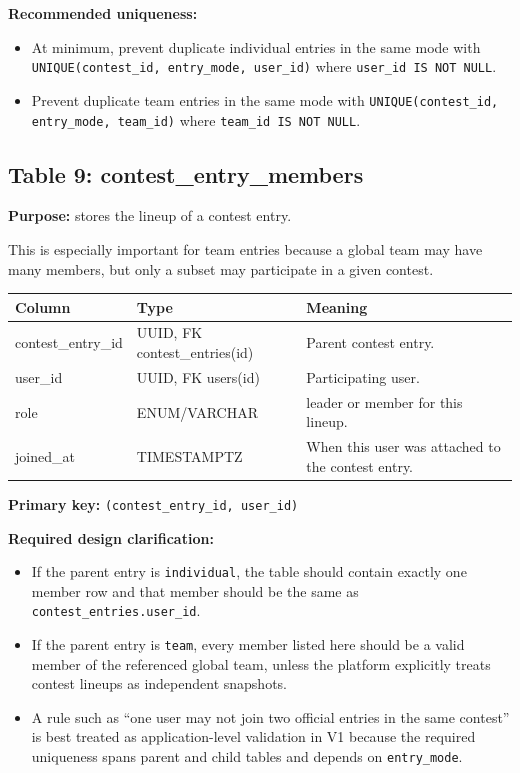 \documentclass[11pt,a4paper]{article}
\begin{document}
\textbf{Recommended uniqueness:}
\begin{itemize}
    \item At minimum, prevent duplicate individual entries in the same mode with \texttt{UNIQUE(contest\_id, entry\_mode, user\_id)} where \texttt{user\_id IS NOT NULL}.
    \item Prevent duplicate team entries in the same mode with \texttt{UNIQUE(contest\_id, entry\_mode, team\_id)} where \texttt{team\_id IS NOT NULL}.
\end{itemize}

\subsection{Table 9: contest\_entry\_members}
\textbf{Purpose:} stores the lineup of a contest entry.

This is especially important for team entries because a global team may have many members, but only a subset may participate in a given contest.

\begin{longtable}{>{\raggedright\arraybackslash}p{} >{\raggedright\arraybackslash}p{} >{\raggedright\arraybackslash}p{}}
\toprule
\textbf{Column} & \textbf{Type} & \textbf{Meaning} \\
\midrule
contest\_entry\_id & UUID, FK contest\_entries(id) & Parent contest entry. \\
user\_id & UUID, FK users(id) & Participating user. \\
role & ENUM/VARCHAR & leader or member for this lineup. \\
joined\_at & TIMESTAMPTZ & When this user was attached to the contest entry. \\
\bottomrule
\end{longtable}

\textbf{Primary key:} \texttt{(contest\_entry\_id, user\_id)}

\textbf{Required design clarification:}
\begin{itemize}
    \item If the parent entry is \texttt{individual}, the table should contain exactly one member row and that member should be the same as \texttt{contest\_entries.user\_id}.
    \item If the parent entry is \texttt{team}, every member listed here should be a valid member of the referenced global team, unless the platform explicitly treats contest lineups as independent snapshots.
    \item A rule such as ``one user may not join two official entries in the same contest'' is best treated as application-level validation in V1 because the required uniqueness spans parent and child tables and depends on \texttt{entry\_mode}.
\end{itemize}
\end{document}
